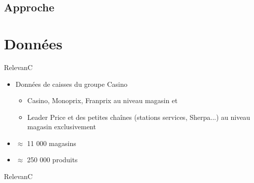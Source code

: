 \documentclass[ignorenonframetext,]{beamer}
\begin{document}
\subsection{Approche}

\section{Données}\label{sec: donnees}

\begin{frame}{RelevanC}

\begin{itemize}
    \item Données de caisses du groupe Casino
    \begin{itemize}
        \item Casino, Monoprix, Franprix au niveau magasin et 
        \item Leader Price et des petites chaînes (stations services, Sherpa...) au niveau magasin exclusivement
    \end{itemize}
    \item $\approx$ 11 000 magasins
    \item $\approx$ 250 000 produits
\end{itemize}

\end{frame}

\begin{frame}{RelevanC}
\end{frame}
\end{document}
